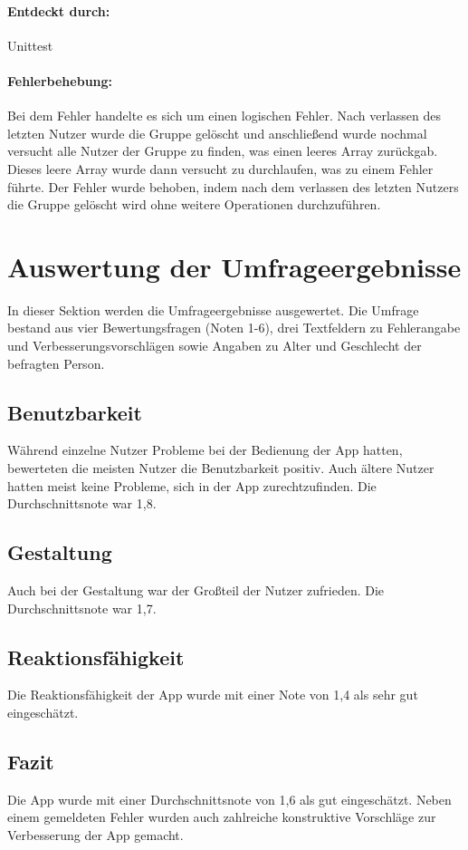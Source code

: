 \documentclass{qualitätssicherungsheft}
\begin{document}
\paragraph*{Entdeckt durch:} Unittest
\paragraph*{Fehlerbehebung:} Bei dem Fehler handelte es sich um einen logischen Fehler. Nach verlassen des letzten Nutzer wurde die Gruppe gelöscht und anschließend wurde nochmal versucht alle Nutzer der Gruppe zu finden, was einen leeres Array zurückgab. Dieses leere Array wurde dann versucht zu durchlaufen, was zu einem Fehler führte. Der Fehler wurde behoben, indem nach dem verlassen des letzten Nutzers die Gruppe gelöscht wird ohne weitere Operationen durchzuführen.

\section{Auswertung der Umfrageergebnisse}
In dieser Sektion werden die Umfrageergebnisse ausgewertet. Die Umfrage bestand aus vier Bewertungsfragen (Noten 1-6), drei Textfeldern zu Fehlerangabe und Verbesserungsvorschlägen sowie Angaben zu Alter und Geschlecht der befragten Person.

\subsection{Benutzbarkeit}
Während einzelne Nutzer Probleme bei der Bedienung der App hatten, bewerteten die meisten Nutzer die Benutzbarkeit positiv. Auch ältere Nutzer hatten meist keine Probleme, sich in der App zurechtzufinden. Die Durchschnittsnote war 1,8.

\subsection{Gestaltung}
Auch bei der Gestaltung war der Großteil der Nutzer zufrieden. Die Durchschnittsnote war 1,7.

\subsection{Reaktionsfähigkeit}
Die Reaktionsfähigkeit der App wurde mit einer Note von 1,4 als sehr gut eingeschätzt.

\subsection{Fazit}
Die App wurde mit einer Durchschnittsnote von 1,6 als gut eingeschätzt. Neben einem gemeldeten Fehler wurden auch zahlreiche konstruktive Vorschläge zur Verbesserung der App gemacht.
\end{document}
